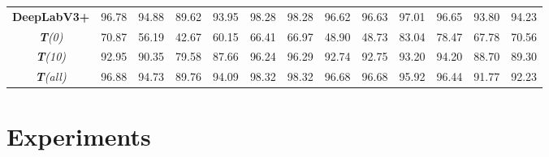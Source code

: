 \documentclass[letterpaper]{article} %
\begin{document}
\begin{table*}[!t]
{\begin{tabular}{ccccccccccccc}
\textbf{DeepLabV3+}  &\textcolor[rgb]{0.00,0.50,0.00}{96.78}  &\textcolor[rgb]{0.80,0.00,0.00}{94.88} &\textcolor[rgb]{0.00,0.50,0.00}{89.62}  &\textcolor[rgb]{0.00,0.50,0.00}{93.95}     &\textcolor[rgb]{0.00,0.50,0.00}{98.28} &\textcolor[rgb]{0.00,0.50,0.00}{98.28} &\textcolor[rgb]{0.00,0.50,0.00}{96.62}& \textcolor[rgb]{0.00,0.50,0.00}{96.63}        &97.01 &96.65 &93.80 & 94.23\\
     \cmidrule(r){1-1} \cmidrule(r){2-5}  \cmidrule(r){6-9} \cmidrule(r){10-13}
\emph{\textbf{T}(0)}   &70.87  &56.19 &42.67 & 60.15     &66.41 &66.97 &48.90 &48.73        &83.04 &78.47 &67.78 & 70.56\\
\emph{\textbf{T}(10)}   &\textcolor[rgb]{0.00,0.00,1.00}{92.95}  &90.35 &79.58 & \textcolor[rgb]{0.00,0.00,1.00}{87.66}     &\textcolor[rgb]{0.00,0.00,1.00}{96.24} &\textcolor[rgb]{0.00,0.00,1.00}{96.29} &\textcolor[rgb]{0.00,0.00,1.00}{92.74} & \textcolor[rgb]{0.00,0.00,1.00}{92.75}       &93.20 &94.20 &88.70 & 89.30\\
\emph{\textbf{T}(all)}  &\textcolor[rgb]{0.80,0.00,0.00}{96.88}  &\textcolor[rgb]{0.00,0.50,0.00}{94.73} &\textcolor[rgb]{0.80,0.00,0.00}{89.76} & \textcolor[rgb]{0.80,0.00,0.00}{94.09}     &\textcolor[rgb]{0.80,0.00,0.00}{98.32} &\textcolor[rgb]{0.80,0.00,0.00}{98.32} &\textcolor[rgb]{0.80,0.00,0.00}{96.68} & \textcolor[rgb]{0.80,0.00,0.00}{96.68}        &95.92 &96.44 &91.77 & 92.23\\
\bottomrule
\end{tabular}}
\vspace{-1.em}
\end{table*}

\section{Experiments}
\end{document}
